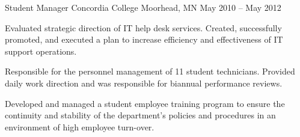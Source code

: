 \cventry
{Student Manager} %
{Concordia College} %
{Moorhead, MN} %
{May 2010 – May 2012} %
{
  	\begin{cvitems} %
        \item {Evaluated strategic direction of IT help desk services.  Created, successfully promoted, and executed a plan to increase efficiency and effectiveness of IT support operations.}
		\item {Responsible for the personnel management of 11 student technicians.  Provided daily work direction and was responsible for biannual performance reviews.}
		\item {Developed and managed a student employee training program to ensure the continuity and stability of the department’s policies and procedures in an environment of high employee turn-over.}
	\end{cvitems}
}